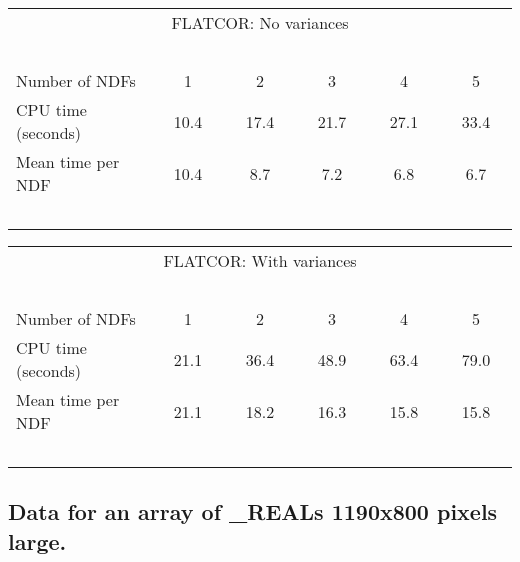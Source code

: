 \begin{center}
   \begin{tabular}{|l||c|c|c|c|c|}
   \multicolumn{6}{c}{FLATCOR: No variances} \\
   \multicolumn{6}{l}{~~~}
   \\ \hline
   Number of NDFs    & ~~~1~~~ & ~~~2~~~ & ~~~3~~~ & ~~~4~~~ & ~~~5~~~
    \\ \hline
   CPU time (seconds)&  10.4   & 17.4   & 21.7   & 27.1   & 33.4
    \\ \hline
   Mean time per NDF & 10.4    & 8.7    & 7.2    &  6.8   & 6.7
    \\ \hline
   \multicolumn{6}{l}{~~~}
   \\
   \end{tabular}
   \begin{tabular}{|l||c|c|c|c|c|}
   \multicolumn{6}{c}{FLATCOR: With variances} \\
   \multicolumn{6}{l}{~~~}
   \\ \hline
   Number of NDFs    & ~~~1~~~ & ~~~2~~~ & ~~~3~~~ & ~~~4~~~ & ~~~5~~~
    \\ \hline
   CPU time (seconds)&  21.1   & 36.4   & 48.9   & 63.4   & 79.0
    \\ \hline
   Mean time per NDF &  21.1   & 18.2   & 16.3   & 15.8   & 15.8
    \\ \hline
   \multicolumn{6}{l}{~~~}
   \\
   \end{tabular}
\end{center}


\begin{center}
\section*{Data for an array of \_REALs 1190x800 pixels large.}
\end{center}


